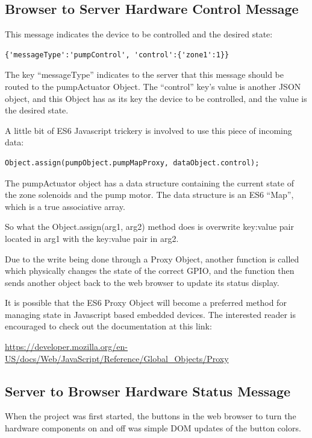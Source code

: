 \subsection{Browser to Server Hardware Control Message}

This message indicates the device to be controlled and the desired state:

\begin{verbatim}
{'messageType':'pumpControl', 'control':{'zone1':1}}
\end{verbatim}

The key ``messageType'' indicates to the server that this message should be 
routed to the pumpActuator Object.  The ``control'' key's value is another JSON 
object, and this Object has as its key the device to be controlled, and the 
value is the desired state.

A little bit of ES6 Javascript trickery is involved to use this piece of 
incoming data:

\begin{verbatim}
Object.assign(pumpObject.pumpMapProxy, dataObject.control);
\end{verbatim}

The pumpActuator object has a data structure containing the current state of 
the zone solenoids and the pump motor.  The data structure is an ES6 ``Map'', 
which is a true associative array.

So what the Object.assign(arg1, arg2) method does is overwrite key:value pair 
located in arg1 with the key:value pair in arg2.

Due to the write being done through a Proxy Object, another function is called 
which physically changes the state of the correct GPIO, and the function then 
sends another object back to the web browser to update its status display.

It is possible that the ES6 Proxy Object will become a preferred method 
for managing state in Javascript based embedded devices.  The interested reader 
is encouraged to check out the documentation at this link:

\url{https://developer.mozilla.org/en-US/docs/Web/JavaScript/Reference/Global_Objects/Proxy}

\subsection{Server to Browser Hardware Status Message}

When the project was first started, the buttons in the web browser to turn the 
hardware components on and off was simple DOM updates of the button colors.

